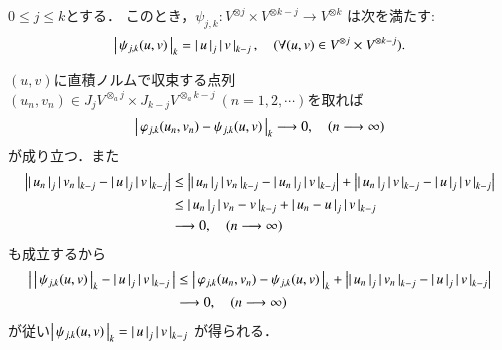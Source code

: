 	\begin{screen}
		\begin{thm}\label{thm:property_of_the_completion_of_the_projective_norm}
			$0 \leq j \leq k$とする．
			このとき，$\psi_{j,k}:V^{\otimes j} \times V^{\otimes k-j} \longrightarrow V^{\otimes k}$
			は次を満たす:
			\begin{align}
				\left|\, \psi_{j,k}(u,v)\, \right|_{k} = \left|\, u\, \right|_{j} \left|\, v\, \right|_{k-j},
				\quad (\forall (u,v) \in V^{\otimes j} \times V^{\otimes k-j}).
			\end{align}
		\end{thm}
	\end{screen}
	
	\begin{prf}
		$(u,v)$に直積ノルムで収束する点列$(u_n,v_n) \in J_j V^{\otimes_a j} \times J_{k-j} V^{\otimes_a k-j}\ (n=1,2,\cdots)$を取れば
		\begin{align}
			\left|\, \varphi_{j,k}(u_n,v_n) - \psi_{j,k}(u,v)\, \right|_{k} \longrightarrow 0,
			\quad (n \longrightarrow \infty)
		\end{align}
		が成り立つ．また
		\begin{align}
			\left| \left|\, u_n\, \right|_{j} \left|\, v_n\, \right|_{k-j} - 
			\left|\, u\, \right|_{j} \left|\, v\, \right|_{k-j} \right|
			&\leq \left| \left|\, u_n\, \right|_{j} \left|\, v_n\, \right|_{k-j} - 
			\left|\, u_n\, \right|_{j} \left|\, v\, \right|_{k-j} \right| 
			+ \left| \left|\, u_n\, \right|_{j} \left|\, v\, \right|_{k-j} - 
			\left|\, u\, \right|_{j} \left|\, v\, \right|_{k-j} \right| \\
			&\leq \left|\, u_n\, \right|_{j} \left|\, v_n - v\, \right|_{k-j} 
			+ \left|\, u_n - u\, \right|_{j} \left|\, v\, \right|_{k-j} \\
			&\longrightarrow 0, \quad (n \longrightarrow \infty)
		\end{align}
		も成立するから
		\begin{align}
			\left|\, \left|\, \psi_{j,k}(u,v)\, \right|_{k} - \left|\, u\, \right|_{j} \left|\, v\, \right|_{k-j}\, \right|
			&\leq \left|\, \varphi_{j,k}(u_n,v_n) - \psi_{j,k}(u,v)\, \right|_{k}
				+ \left| \left|\, u_n\, \right|_{j} \left|\, v_n\, \right|_{k-j} - 
			\left|\, u\, \right|_{j} \left|\, v\, \right|_{k-j} \right| \\
			& \longrightarrow 0, \quad (n \longrightarrow \infty)
		\end{align}
		が従い$\left|\, \psi_{j,k}(u,v)\, \right|_{k} = \left|\, u\, \right|_{j} \left|\, v\, \right|_{k-j}$
		が得られる．
		\QED
	\end{prf}
	
